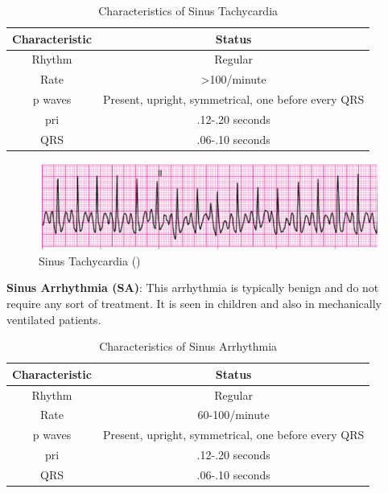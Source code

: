 \begin{table}[H]
\begin{center}
\begin{tabular}{||c || c||}
 \hline
\textbf{Characteristic} & \textbf{Status} \\ [0.4ex] 
 \hline\hline
 Rhythm & Regular \\
\hline
Rate & >100/minute \\
\hline
p waves & Present, upright, symmetrical, one before every QRS \\
\hline
pri & .12-.20 seconds \\
\hline
QRS & .06-.10 seconds \\
\hline\hline
\end{tabular}
\end{center}
\caption{Characteristics of Sinus Tachycardia}
\label{table:STach_characteristics}
\end{table}


 \begin{figure}[H]
\centering
\includegraphics[scale=0.8]{img/STach.png}
\caption{Sinus Tachycardia (\cite{arryth_types})}
\label{fig:STach}
\end{figure}

\textbf{Sinus Arrhythmia (SA)}: This arrhythmia is typically benign and do not require any sort of treatment. It is seen in children and also in mechanically ventilated patients.

\begin{table}[H]
\begin{center}
\begin{tabular}{||c || c||}
 \hline
\textbf{Characteristic} & \textbf{Status} \\ [0.4ex] 
 \hline\hline
 Rhythm & Regular \\
\hline
Rate & 60-100/minute \\
\hline
p waves & Present, upright, symmetrical, one before every QRS \\
\hline
pri & .12-.20 seconds \\
\hline
QRS & .06-.10 seconds \\
\hline\hline
\end{tabular}
\end{center}
\caption{Characteristics of Sinus Arrhythmia}
\label{table:SA_characteristics}
\end{table}


